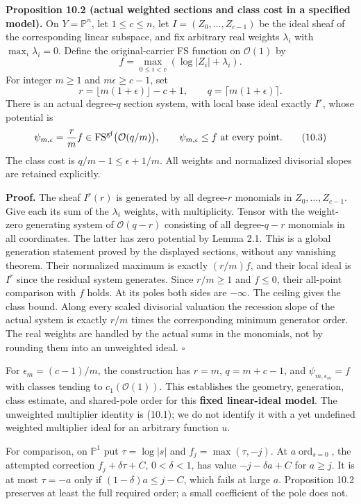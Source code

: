 \documentclass[
  10pt,
]{article}
\begin{document}
\textbf{Proposition 10.2 (actual weighted sections and class cost in a
specified model).} On \(Y=\mathbb P^n\), let \(1\leq c\leq n\), let
\(I=(Z_0,\ldots,Z_{c-1})\) be the ideal sheaf of the corresponding
linear subspace, and fix arbitrary real weights \(\lambda_i\) with
\(\max_i\lambda_i=0\). Define the original-carrier FS function on
\(\mathcal O(1)\) by \[
 f=\max_{0\leq i<c}(\log|Z_i|+\lambda_i).
\] For integer \(m\geq1\) and \(m\epsilon\geq c-1\), set \[
 r=\lfloor m(1+\epsilon)\rfloor-c+1,\qquad
 q=\lceil m(1+\epsilon)\rceil.
\] There is an actual degree-\(q\) section system, with local base ideal
exactly \(I^r\), whose potential is \[
 \psi_{m,\epsilon}=\frac rm f
   \in\operatorname{FS}^{\rm gf}\bigl(\mathcal O(q/m)\bigr),
 \qquad \psi_{m,\epsilon}\leq f\text{ at every point}.           \tag{10.3}
\] The class cost is \(q/m-1\leq\epsilon+1/m\). All weights and
normalized divisorial slopes are retained explicitly.

\textbf{Proof.} The sheaf \(I^r(r)\) is generated by all degree-\(r\)
monomials in \(Z_0,\ldots,Z_{c-1}\). Give each its sum of the
\(\lambda_i\) weights, with multiplicity. Tensor with the weight-zero
generating system of \(\mathcal O(q-r)\) consisting of all
degree-\(q-r\) monomials in all coordinates. The latter has zero
potential by Lemma 2.1. This is a global generation statement proved by
the displayed sections, without any vanishing theorem. Their normalized
maximum is exactly \((r/m)f\), and their local ideal is \(I^r\) since
the residual system generates. Since \(r/m\geq1\) and \(f\leq0\), their
all-point comparison with \(f\) holds. At its poles both sides are
\(-\infty\). The ceiling gives the class bound. Along every scaled
divisorial valuation the recession slope of the actual system is exactly
\(r/m\) times the corresponding minimum generator order. The real
weights are handled by the actual sums in the monomials, not by rounding
them into an unweighted ideal. \(\square\)

For \(\epsilon_m=(c-1)/m\), the construction has \(r=m\), \(q=m+c-1\),
and \(\psi_{m,\epsilon_m}=f\) with classes tending to
\(c_1(\mathcal O(1))\). This establishes the geometry, generation, class
estimate, and shared-pole order for this \textbf{fixed linear-ideal
model}. The unweighted multiplier identity is (10.1); we do not identify
it with a yet undefined weighted multiplier ideal for an arbitrary
function \(u\).

For comparison, on \(\mathbb P^1\) put \(\tau=\log|s|\) and
\(f_j=\max(\tau,-j)\). At \(a\operatorname{ord}_{s=0}\), the attempted
correction \(f_j+\delta\tau+C\), \(0<\delta<1\), has value
\(-j-\delta a+C\) for \(a\geq j\). It is at most \(\tau=-a\) only if
\((1-\delta)a\leq j-C\), which fails at large \(a\). Proposition 10.2
preserves at least the full required order; a small coefficient of the
pole does not.
\end{document}
